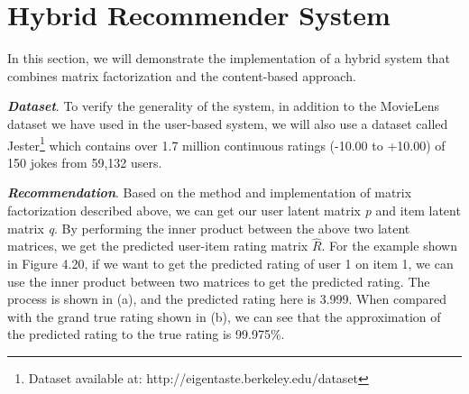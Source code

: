 \section{Hybrid Recommender System}
In this section, we will demonstrate the implementation of a hybrid system that combines matrix factorization and the content-based approach.

\textbf{\textit{Dataset}}. To verify the generality of the system, in addition to the MovieLens dataset we have used in the user-based system, we will also use a dataset called Jester\footnote[4]{Dataset available at: http://eigentaste.berkeley.edu/dataset} which contains over 1.7 million continuous ratings (-10.00 to +10.00) of 150 jokes from 59,132 users.

\textbf{\textit{Recommendation}}. Based on the method and implementation of matrix factorization described above, we can get our user latent matrix \textit{p} and item latent matrix \textit{q}. By performing the inner product between the above two latent matrices, we get the predicted user-item rating matrix $\hat{R}$. For the example shown in Figure 4.20, if we want to get the predicted rating of user 1 on item 1, we can use the inner product between two matrices to get the predicted rating. The process is shown in (a), and the predicted rating here is 3.999. When compared with the grand true rating shown in (b), we can see that the approximation of the predicted rating to the true rating is 99.975$\%$.

